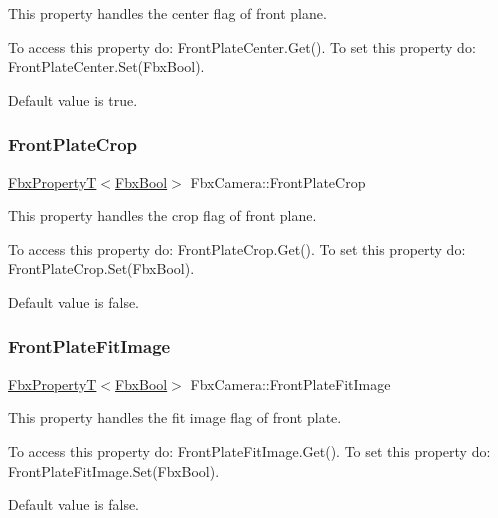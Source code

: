 This property handles the center flag of front plane.

To access this property do\+: Front\+Plate\+Center.\+Get(). To set this property do\+: Front\+Plate\+Center.\+Set(\+Fbx\+Bool).

Default value is true. \mbox{\label{class_fbx_camera_af409f4d6dd0b68de9a3e0c2f17644362}} 
\subsubsection{\texorpdfstring{Front\+Plate\+Crop}{FrontPlateCrop}}
{\footnotesize\ttfamily \hyperlink{class_fbx_property_t}{Fbx\+PropertyT}$<$\hyperlink{fbxtypes_8h_a92e0562b2fe33e76a242f498b362262e}{Fbx\+Bool}$>$ Fbx\+Camera\+::\+Front\+Plate\+Crop}

This property handles the crop flag of front plane.

To access this property do\+: Front\+Plate\+Crop.\+Get(). To set this property do\+: Front\+Plate\+Crop.\+Set(\+Fbx\+Bool).

Default value is false. \mbox{\label{class_fbx_camera_a98c919c1ec1398479c859357d3f454d7}} 
\subsubsection{\texorpdfstring{Front\+Plate\+Fit\+Image}{FrontPlateFitImage}}
{\footnotesize\ttfamily \hyperlink{class_fbx_property_t}{Fbx\+PropertyT}$<$\hyperlink{fbxtypes_8h_a92e0562b2fe33e76a242f498b362262e}{Fbx\+Bool}$>$ Fbx\+Camera\+::\+Front\+Plate\+Fit\+Image}

This property handles the fit image flag of front plate.

To access this property do\+: Front\+Plate\+Fit\+Image.\+Get(). To set this property do\+: Front\+Plate\+Fit\+Image.\+Set(\+Fbx\+Bool).

Default value is false. \mbox{\label{class_fbx_camera_aa4066eaf0f9d506db8b83353db3e4ef7}} 
